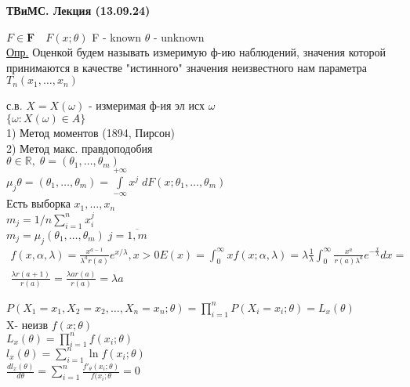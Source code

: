 \documentclass[12pt]{article}
\begin{document}
    \begin{center}
        \textbf{ТВиМС. Лекция (13.09.24)}
    \end{center}

    $F \in \mathbf{F} \quad F(x; \theta)$ F - known $\theta$ - unknown \\

    \underline{Опр.} Оценкой будем называть измеримую ф-ию наблюдений, значения которой
    принимаются в качестве "истинного" значения неизвестного нам параметра \\
    $ T_n(x_1, \dots, x_n) $

    с.в. $ X = X(\omega) $ - измеримая ф-ия эл исх $\omega$\\
    $ \{ \omega: X(\omega) \in A \} $ \\
    1) Метод моментов (1894, Пирсон) \\
    2) Метод макс. правдоподобия\\
    $ \theta \in \mathbb{R}, \; \theta=(\theta_1, \dots, \theta_m) $\\
    $ \mu_j \theta=(\theta_1, \dots, \theta_m) = \int\limits_{-\infty}^{+\infty} x^j 
    \; dF(x; \theta_1, \dots, \theta_m) $ \\
    Есть выборка $x_1, \dots, x_n$ \\
    $ m_j = 1/n \sum\limits_{i=1}^{n} x_i^j $\\
    $ m_j = \mu_j(\theta_1, \dots, \theta_m) \; j= \overline{1, m} $\\
    \[
    \begin{split}
        f(x, \alpha, \lambda) = \frac{x^{a-1}}{\lambda^a r(a)}e^{x/\lambda}, x > 0 
        E(x) = \int_{0}^{\infty} x f(x; \alpha, \lambda) = \lambda \frac{1}{\lambda}
        \int_0^\infty \frac{x^a}{r(a) \lambda^a} e^{-\frac{x}{\lambda}} dx = \\
        \frac{\lambda r(a+1)}{r(a)} = \frac{\lambda ar(a)}{r(a)} = \lambda a
    \end{split}
    \]

    $ P(X_1=x_1, X_2=x_2, \dots, X_n=x_n; \theta) = \prod\limits_{i=1}^n
    P(X_i=x_i; \theta) = L_x(\theta)$ \\
    X- неизв $f(x; \theta)$ \\
    $ L_x(\theta) = \prod\limits_{i=1}^n f(x_i; \theta) $\\
    $ l_x(\theta) = \sum\limits_{i=1}^n \ln f(x_i; \theta) $ \\
    $ \frac{dl_x(\theta)}{d\theta} = \sum\limits_{i=1}^n \frac{f'_\theta(x_i; \theta)}
    {f(x_i; \theta} = 0 $\\
\end{document}
